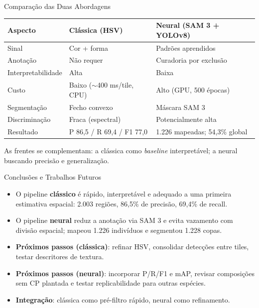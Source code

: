 \documentclass[aspectratio=169, 11pt]{beamer}
\begin{document}
\begin{frame}{Comparação das Duas Abordagens}
    \begin{table}
        \centering
        \small
        \begin{tabular}{lll}
            \toprule
            \textbf{Aspecto} & \textbf{Clássica (HSV)} & \textbf{Neural (SAM 3 + YOLOv8)} \\
            \midrule
            Sinal & Cor + forma & Padrões aprendidos \\
            Anotação & Não requer & Curadoria por exclusão \\
            Interpretabilidade & Alta & Baixa \\
            Custo & Baixo ($\sim$400 ms/tile, CPU) & Alto (GPU, 500 épocas) \\
            Segmentação & Fecho convexo & Máscara SAM 3 \\
            Discriminação & Fraca (espectral) & Potencialmente alta \\
            Resultado & P 86,5 / R 69,4 / F1 77,0 & 1.226 mapeadas; 54,3\% global \\
            \bottomrule
        \end{tabular}
    \end{table}
    \vspace{0.3em}
    \small As frentes se complementam: a clássica como \textit{baseline} interpretável; a neural buscando precisão e generalização.
\end{frame}

\begin{frame}{Conclusões e Trabalhos Futuros}
    \begin{itemize}
        \item O pipeline \textbf{clássico} é rápido, interpretável e adequado a uma
        primeira estimativa espacial: 2.003 regiões, 86,5\% de precisão, 69,4\% de recall.
        \item O pipeline \textbf{neural} reduz a anotação via SAM 3 e evita vazamento com
        divisão espacial; mapeou 1.226 indivíduos e segmentou 1.228 copas.
        \item \textbf{Próximos passos (clássica)}: refinar HSV, consolidar detecções entre
        tiles, testar descritores de textura.
        \item \textbf{Próximos passos (neural)}: incorporar P/R/F1 e mAP, revisar
        composições sem CP plantada e testar replicabilidade para outras espécies.
        \item \textbf{Integração}: clássica como pré-filtro rápido, neural como refinamento.
    \end{itemize}
\end{frame}
\end{document}
